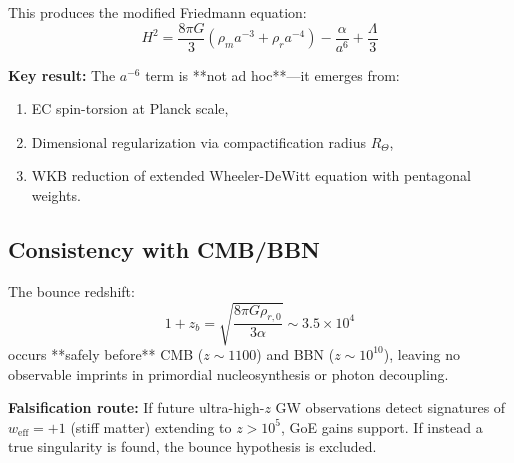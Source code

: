 \documentclass[12pt]{article}
\begin{document}
This produces the modified Friedmann equation:
\begin{equation}
H^2 = \frac{8\pi G}{3}\left(\rho_m a^{-3} + \rho_r a^{-4}\right) - \frac{\alpha}{a^6} + \frac{\Lambda}{3}
\end{equation}

\textbf{Key result:} The $a^{-6}$ term is **not ad hoc**—it emerges from:
\begin{enumerate}
\item EC spin-torsion at Planck scale,
\item Dimensional regularization via compactification radius $R_\Theta$,
\item WKB reduction of extended Wheeler-DeWitt equation with pentagonal weights.
\end{enumerate}

\subsection{Consistency with CMB/BBN}

The bounce redshift:
\begin{equation}
1 + z_b = \sqrt{\frac{8\pi G \rho_{r,0}}{3\alpha}} \sim 3.5 \times 10^4
\end{equation}
occurs **safely before** CMB ($z \sim 1100$) and BBN ($z \sim 10^{10}$), leaving no observable imprints in primordial nucleosynthesis or photon decoupling.

\textbf{Falsification route:} If future ultra-high-$z$ GW observations detect signatures of $w_{\text{eff}} = +1$ (stiff matter) extending to $z > 10^5$, GoE gains support. If instead a true singularity is found, the bounce hypothesis is excluded.



\end{document}
